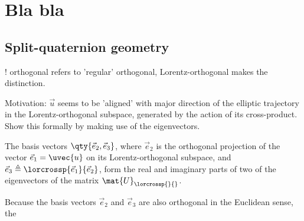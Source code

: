 \chapter{Bla bla}
\section{Split-quaternion geometry}
! orthogonal refers to 'regular' orthogonal, Lorentz-orthogonal makes the distinction.

Motivation: $\vec{u}$ seems to be 'aligned' with major direction of the elliptic trajectory in the Lorentz-orthogonal subspace, generated by the action of its cross-product. Show this formally by making use of the eigenvectors.

The basis vectors $ \qty{\vec{e}_2, \vec{e}_3}$, where $\vec{e}_2$ is the orthogonal projection of the vector $\vec{e}_1 = \uvec{u}$ on its Lorentz-orthogonal subspace, and $\vec{e}_3 \triangleq \lorcrossp{\vec{e}_1}{\vec{e}_2}$, form the real and imaginary parts of two of the eigenvectors of the matrix $\mat{U}_{\lorcrossp{}{}}$. 

Because the basis vectors $\vec{e}_2$ and $\vec{e}_3$ are also orthogonal in the Euclidean sense, the 

